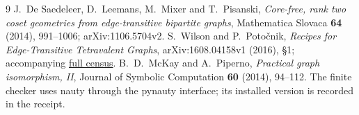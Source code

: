 \documentclass[11pt,a4paper]{article}
\begin{document}
\begin{thebibliography}{9}
 J.~De Saedeleer, D.~Leemans, M.~Mixer and T.~Pisanski,
\emph{Core-free, rank two coset geometries from edge-transitive
bipartite graphs}, Mathematica Slovaca \textbf{64} (2014), 991--1006;
arXiv:1106.5704v2.
 S.~Wilson and P.~Poto\v cnik,
\emph{Recipes for Edge-Transitive Tetravalent Graphs},
arXiv:1608.04158v1 (2016), \S1; accompanying
\href{https://jan.ucc.nau.edu/swilson/C4FullSite/index.html}{full census}.
 B.~D.~McKay and A.~Piperno,
\emph{Practical graph isomorphism, II}, Journal of Symbolic
Computation \textbf{60} (2014), 94--112. The finite checker uses
nauty through the pynauty interface; its installed version is
recorded in the receipt.
\end{thebibliography}
\end{document}
